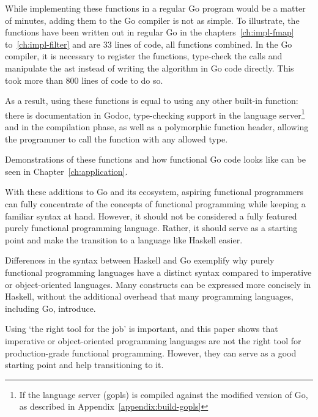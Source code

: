 While implementing these functions in a regular Go program would be a matter of minutes,
adding them to the Go compiler is not as simple. To illustrate, the functions
have been written out in regular Go in the chapters~\ref{ch:impl-fmap} to~\ref{ch:impl-filter}
and are 33 lines of code, all functions combined. In the Go compiler, it is necessary to
register the functions, type-check the calls and manipulate the \gls{ast} instead of writing
the algorithm in Go code directly. This took more than 800 lines of code to do so.

As a result, using these functions is equal to using any other built-in function: there
is documentation in Godoc, type-checking support in the language server\footnote{If the
language server (gopls) is compiled against the modified version of Go, as
described in Appendix~\ref{appendix:build-gopls}}
and in the compilation phase, as well as a polymorphic function header, allowing the
programmer to call the function with any allowed type.

Demonstrations of these functions and how functional Go code looks like can be seen in
Chapter~\ref{ch:application}.

With these additions to Go and its ecosystem, aspiring functional programmers
can fully concentrate of the concepts of functional programming while keeping
a familiar syntax at hand. However, it should not be considered a fully featured
purely functional programming language. Rather, it should serve as a starting point and
make the transition to a language like Haskell easier.

Differences in the syntax between Haskell and Go exemplify why purely functional programming
languages have a distinct syntax compared to imperative or object-oriented languages.
Many constructs can be expressed more concisely in Haskell, without the additional
overhead that many programming languages, including Go, introduce.

Using `the right tool for the job' is important, and this paper shows that imperative or
object-oriented programming languages are not the right tool for production-grade
functional programming. However, they can serve as a good starting point and help transitioning
to it.
